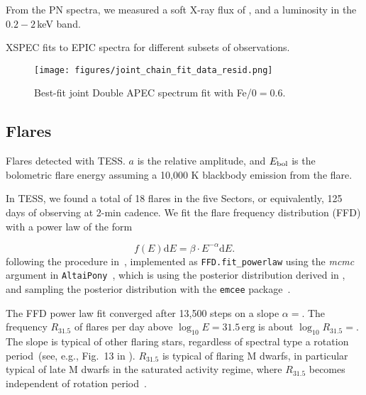 \documentclass[twocolumn]{aastex631}
\begin{document}
From the PN spectra, we measured a soft X-ray flux of \FX, and a luminosity \LX in the $0.2-2\,$keV band. 
 \begin{table}
\centering
    \caption{XSPEC fits to EPIC spectra for different subsets of observations.}
    
        \label{tab:specfit}
\end{table}


\begin{figure}
    \begin{centering}
        \texttt{[image: figures/joint\_chain\_fit\_data\_resid.png]}
        \caption{
         Best-fit joint Double APEC spectrum fit with Fe/0$=0.6$.
        }
        \label{fig:spec_joint_all}
    \end{centering}
\end{figure}


\subsection{Flares}
\label{sec:res:flares}



\begin{table}
\centering
    \caption{Flares detected with TESS. $a$ is the relative amplitude, and $E_{\rm bol}$ is the bolometric flare energy assuming a 10,000 K blackbody emission from the flare.}
    
        \label{tab:flares}
\end{table}


In TESS, we found a total of 18 flares in the five Sectors, or equivalently, 125 days of observing at 2-min cadence. We fit the flare frequency distribution (FFD) with a power law of the form

\begin{equation}
    f(E) \mathrm{d} E = \beta \cdot E^{-\alpha} \mathrm{d} E.
\end{equation}
following the procedure in~\citep{ilin2021flares}, implemented as \texttt{FFD.fit\_powerlaw} using the \textit{mcmc} argument in \texttt{AltaiPony}~\citep{ilin2021altaipony}, which is using the posterior distribution derived in \citet{wheatland2004bayesian}, and sampling the posterior distribution with the \texttt{emcee} package~\citep{foreman-mackey2013emcee}.

The FFD power law fit converged after 13,500 steps on a slope $\alpha =$\ffdalpha. The frequency $R_{31.5}$ of flares per day above $\log_{10} E = 31.5\,\mathrm{erg}$ is about $\log_{10}R_{31.5}=$\ffdr. The slope is typical of other flaring stars, regardless of spectral type a rotation period~(see, e.g., Fig.~13 in \citealt{ilin2021flares}). $R_{31.5}$ is typical of flaring M dwarfs, in particular typical of late M dwarfs in the saturated activity regime, where $R_{31.5}$ becomes independent of rotation period~\citep{medina2020flare,murray2022study}. 
\end{document}
